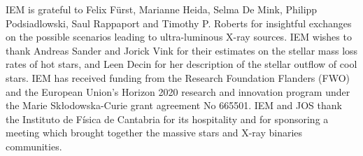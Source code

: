 \documentclass[letter]{aa}
\makeatletter
\newcommand{\sgx}{SgXB\xspace}
\newcommand*{\ns}{NS\@\xspace}
\makeatother
\begin{document}

\begin{acknowledgements}
IEM is grateful to Felix F\"{u}rst, Marianne Heida, Selma De Mink, Philipp Podsiadlowski, Saul Rappaport and Timothy P. Roberts for insightful exchanges on the possible scenarios leading to ultra-luminous X-ray sources. IEM wishes to thank Andreas Sander and Jorick Vink for their estimates on the stellar mass loss rates of hot stars, and Leen Decin for her description of the stellar outflow of cool stars. IEM has received funding from the Research Foundation Flanders (FWO) and the European Union's Horizon 2020 research and innovation program under the Marie Sk\l odowska-Curie grant agreement No 665501. IEM and JOS thank the Instituto de F\'{i}sica de Cantabria for its hospitality and for sponsoring a meeting which brought together the massive stars and X-ray binaries communities.
\end{acknowledgements}


\begin{tiny}

\end{tiny}
\end{document}
